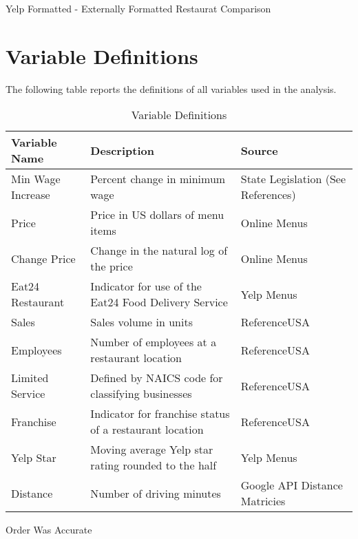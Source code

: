 \documentclass[11pt]{article}
\begin{document}
\begin{table}[H]\caption{Yelp Formatted - Externally Formatted Restaurat Comparison}
\begin{center}


\end{center}
\end{table}

\newpage

\section{Variable Definitions}
The following table reports the definitions of all variables used in the analysis.


\begin{center}

\begin{table}[H]\caption{Variable Definitions}
\begin{tabular}{l l l} \hline
Variable Name & Description & Source \\ \hline
Min Wage Increase & Percent change in minimum wage & State Legislation (See References) \\
Price & Price in US dollars of menu items  & Online Menus \\
Change Price & Change in the natural log of the price & Online Menus \\
Eat24 Restaurant & Indicator for use of the Eat24 Food Delivery Service & Yelp Menus \\
Sales & Sales volume in units & ReferenceUSA\\
Employees & Number of employees at a restaurant location & ReferenceUSA  \\
Limited Service & Defined by NAICS code for classifying businesses & ReferenceUSA \\
Franchise & Indicator for franchise status of a restaurant location & ReferenceUSA \\
Yelp Star & Moving average Yelp star rating rounded to the half & Yelp Menus\\
Distance & Number of driving minutes & Google API Distance Matricies\\
\end{tabular}

\end{table}

\end{center}

\newpage

\begin{table}[H]\caption{Order Was Accurate}

\end{table}
\end{document}
